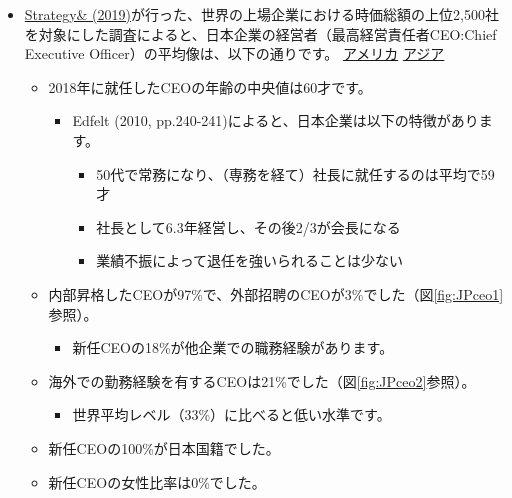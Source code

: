 \documentclass[
]{book}
\providecommand{\tightlist}{%
  \setlength{\itemsep}{0pt}\setlength{\parskip}{0pt}}
\begin{document}
\begin{itemize}
\item
  \href{https://www.strategyand.pwc.com/jp/ja/publications/2018_ceo-data-media-release-jp.pdf}{Strategy\& (2019)}が行った、世界の上場企業における時価総額の上位2,500社を対象にした調査によると、日本企業の経営者（最高経営責任者CEO:Chief Executive Officer）の平均像は、以下の通りです。 \protect\hyperlink{us-selection}{アメリカ} \protect\hyperlink{asia-selection}{アジア}

  \begin{itemize}
  \item
    2018年に就任したCEOの年齢の中央値は60才です。

    \begin{itemize}
    \item
      Edfelt (2010, pp.240-241)によると、日本企業は以下の特徴があります。

      \begin{itemize}
      \item
        50代で常務になり、（専務を経て）社長に就任するのは平均で59才
      \item
        社長として6.3年経営し、その後2/3が会長になる
      \item
        業績不振によって退任を強いられることは少ない
      \end{itemize}
    \end{itemize}
  \item
    内部昇格したCEOが97\%で、外部招聘のCEOが3\%でした（図\ref{fig:JPceo1}参照）。

    \begin{itemize}
    \tightlist
    \item
      新任CEOの18\%が他企業での職務経験があります。
    \end{itemize}
  \item
    海外での勤務経験を有するCEOは21\%でした（図\ref{fig:JPceo2}参照）。
    　

    \begin{itemize}
    \tightlist
    \item
      世界平均レベル（33\%）に比べると低い水準です。
    \end{itemize}
  \item
    新任CEOの100\%が日本国籍でした。
  \item
    新任CEOの女性比率は0\%でした。


\end{itemize}
\end{itemize}
\end{document}
